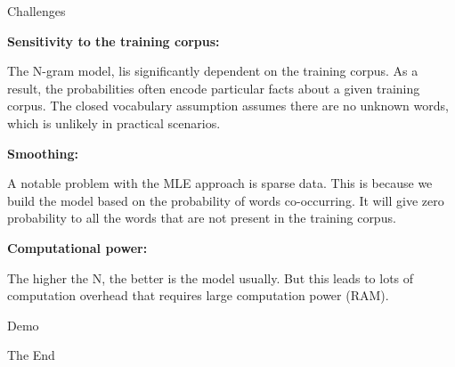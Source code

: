 \documentclass{beamer}
\newcommand\myheading[1]{%
  \par\bigskip
  {\large\bfseries#1}\par\smallskip}
\begin{document}
\begin{frame}{Challenges}
\begin{flushleft}
\myheading {Sensitivity to the training corpus:}
	\item The N-gram model, lis significantly dependent on the training corpus. As a result, the probabilities often encode particular facts about a given training corpus. The closed vocabulary assumption assumes there are no unknown words, which is unlikely in practical scenarios.
\myheading{Smoothing:} 
A notable problem with the MLE approach is sparse data. This is because we build the model based on the probability of words co-occurring. It will give zero probability to all the words that are not present in the training corpus.
\myheading{Computational power:}
	\item The higher the N, the better is the model usually. But this leads to lots of computation overhead that requires large computation power (RAM).
	\end{flushleft}
\end{frame}

\begin{frame}
\huge{\centerline{Demo}}
\end{frame}

\begin{frame}
\huge{\centerline{The End}}
\end{frame}
\end{document}
